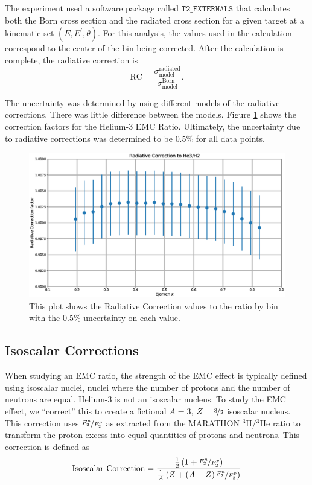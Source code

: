 The experiment used a software package called $\texttt{T2\_EXTERNALS}$ that calculates both the Born cross section and the radiated cross section for a given target at a kinematic set $(E,E^{\prime} ,\theta )$. For this analysis, the values used in the calculation correspond to the center of the bin being corrected. After the calculation is complete, the radiative correction is
\begin{equation}
	\textrm{RC} = \frac{\sigma^{\textrm{radiated}}_{\textrm{model}}}{\sigma^{\textrm{Born}}_{\textrm{model}}}.
\end{equation}

The uncertainty was determined by using different models of the radiative corrections. There was little difference between the models. Figure \ref{fig:radcor} shows the correction factors for the Helium-3 EMC Ratio. Ultimately, the uncertainty due to radiative corrections was determined to be $0.5\%$ for all data points.

\begin{figure}
	\includegraphics[width=\textwidth]{./analysis/fig/radcor.eps}
	\caption{This plot shows the Radiative Correction values to the  ratio by bin with the $0.5\%$ uncertainty on each value.}
	\label{fig:radcor}
\end{figure}

\subsection{Isoscalar Corrections}
\label{sec:isocor}

When studying an EMC ratio, the strength of the EMC effect is typically defined using isoscalar nuclei, nuclei where the number of protons and the number of neutrons are equal. Helium-3 is not an isoscalar nucleus. To study the EMC effect, we ``correct'' this to create a fictional $A=3$, $Z=\nicefrac{3}{2}$ isoscalar nucleus. This correction uses $\nicefrac{F_2^n}{F_2^p}$ as extracted from the MARATHON $^3$H/$^3$He ratio to transform the proton excess into equal quantities of protons and neutrons. This correction is defined as
\begin{equation}
	\textrm{Isoscalar Correction} = \frac{\frac{1}{2}\left(1+\nicefrac{F_2^n}{F_2^p}\right)}{\frac{1}{A}\left(Z+\left(A-Z\right)\nicefrac{F_2^n}{F_2^p}\right)}
\end{equation}

